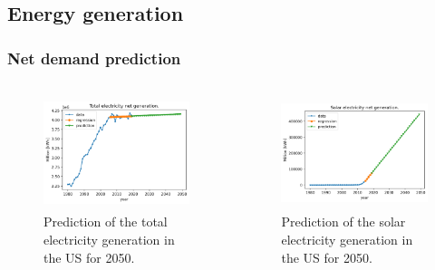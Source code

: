 \subsection{Energy generation}
\begin{frame}
\frametitle{Net demand prediction}
\begin{columns}
    \column[t]{5cm}
	\begin{figure}[htbp!]
		\begin{center}
			\includegraphics[height=3.3cm]{images/us-prediction1}
		\end{center}
		\caption{Prediction of the total electricity generation in the US for 2050.}
	\end{figure}

    \column[t]{5cm}
	\begin{figure}[htbp!]
		\begin{center}
			\includegraphics[height=3.3cm]{images/us-prediction2}
		\end{center}
		\caption{Prediction of the solar electricity generation in the US for 2050.}
	\end{figure}
\end{columns}
\end{frame}


